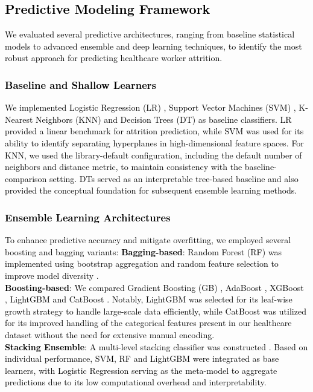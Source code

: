\documentclass[a4paper,fleqn]{cas-sc}
\begin{document}
\subsection{\textcolor{black}{Predictive Modeling Framework}}
\textcolor{black}{We evaluated several predictive architectures, ranging from baseline statistical models to advanced ensemble and deep learning techniques, to identify the most robust approach for predicting healthcare worker attrition.}

\subsubsection{\textcolor{black}{Baseline and Shallow Learners}}
\textcolor{black}{We implemented Logistic Regression (LR) \cite{logisRegr}, Support Vector Machines (SVM) \cite{cortes1995support}, K-Nearest Neighbors (KNN) \cite{fix1951knn} and Decision Trees (DT) \cite{breiman1984classification} as baseline classifiers. LR provided a linear benchmark for attrition prediction, while SVM was used for its ability to identify separating hyperplanes in high-dimensional feature spaces. For KNN, we used the library-default configuration, including the default number of neighbors and distance metric, to maintain consistency with the baseline-comparison setting. DTs served as an interpretable tree-based baseline and also provided the conceptual foundation for subsequent ensemble learning methods.}

\subsubsection{\textcolor{black}{Ensemble Learning Architectures}}
\textcolor{black}{To enhance predictive accuracy and mitigate overfitting, we employed several boosting and bagging variants:
\textbf{Bagging-based}: Random Forest (RF) was implemented using bootstrap aggregation and random feature selection to improve model diversity \cite{breiman2001random}.\\
\textbf{Boosting-based}: We compared Gradient Boosting (GB) \cite{friedman2001greedy}, AdaBoost \cite{freund1997decision}, XGBoost \cite{chen2016xgboost}, LightGBM \cite{ke2017lightgbm} and CatBoost \cite{prokhorenkova2018catboost}. Notably, LightGBM was selected for its leaf-wise growth strategy to handle large-scale data efficiently, while CatBoost was utilized for its improved handling of the categorical features present in our healthcare dataset without the need for extensive manual encoding.\\
\textbf{Stacking Ensemble}: A multi-level stacking classifier was constructed \cite{dzeroski2004stacking}. Based on individual performance, SVM, RF and LightGBM were integrated as base learners, with Logistic Regression serving as the meta-model to aggregate predictions due to its low computational overhead and interpretability.} 
\end{document}
